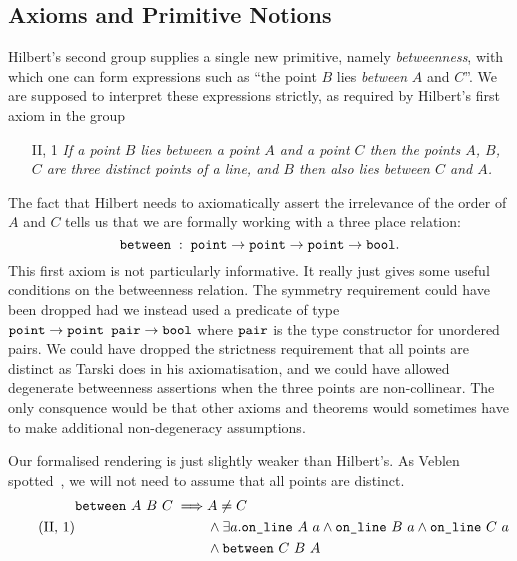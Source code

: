 \subsection{Axioms and Primitive Notions}
Hilbert's second group supplies a single new primitive, namely \emph{betweenness}, with which one can form expressions such as ``the point $B$ lies \emph{between} $A$ and $C$''. We are supposed to interpret these expressions strictly, as required by Hilbert's first axiom in the group
\begin{enumerate}
\item[II, 1] \emph{If a point $B$ lies between a point $A$ and a point $C$ then the points $A$, $B$, $C$ are three distinct points of a line, and $B$ then also lies between $C$ and $A$.}
\end{enumerate}
The fact that Hilbert needs to axiomatically assert the irrelevance of the order of $A$ and $C$ tells us that we are formally working with a three place relation:
\begin{displaymath}
\texttt{between}\;:\;\texttt{point}\rightarrow\texttt{point}\rightarrow\texttt{point}\rightarrow\texttt{bool}.
\end{displaymath}
This first axiom is not particularly informative. It really just gives some useful conditions on the betweenness relation. The symmetry requirement could have been dropped had we instead used a predicate of type $\texttt{point}\rightarrow \texttt{point pair} \rightarrow \texttt{bool}$ where $\texttt{pair}$ is the type constructor for unordered pairs. We could have dropped the strictness requirement that all points are distinct as Tarski does in his axiomatisation, and we could have allowed degenerate betweenness assertions when the three points are non-collinear. The only consquence would be that other axioms and theorems would sometimes have to make additional non-degeneracy assumptions.

Our formalised rendering is just slightly weaker than Hilbert's. As Veblen spotted~\cite{Veblenphd}, we will not need to assume that all points are distinct. 
\begin{equation}\label{eq:g21} 
 \tag{II, 1}
  \begin{split}
    \between{A}{B}{C} \implies & A \neq C\\
                               & \wedge \exists a. \code{on\_line}\ A\ a \wedge \code{on\_line}\ B\ a \wedge \code{on\_line}\ C\ a\\
                               & \wedge \between{C}{B}{A}
  \end{split}
\end{equation}

